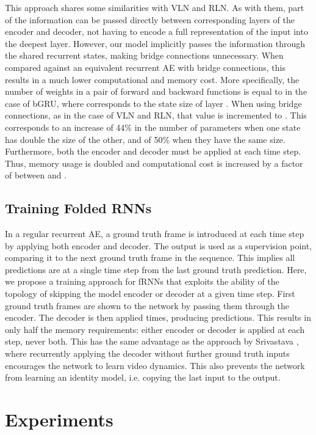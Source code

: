 \documentclass[runningheads]{llncs}
\begin{document}
This approach shares some similarities with VLN and RLN. As with them, part of the information can be passed directly between corresponding layers of the encoder and decoder, not having to encode a full representation of the input into the deepest layer. However, our model implicitly passes the information through the shared recurrent states, making bridge connections unnecessary. When compared against an equivalent recurrent AE with bridge connections, this results in a much lower computational and memory cost. More specifically, the number of weights in a pair of forward and backward functions is equal to  in the case of bGRU, where  corresponds to the state size of layer . When using bridge connections, as in the case of VLN and RLN, that value is incremented to . This corresponds to an increase of 44\% in the number of parameters when one state has double the size of the other, and of 50\% when they have the same size. Furthermore, both the encoder and decoder must be applied at each time step. Thus, memory usage is doubled and computational cost is increased by a factor of between  and .

\subsection{Training Folded RNNs}
\label{sec:method:training}

In a regular recurrent AE, a ground truth frame is introduced at each time step by applying both encoder and decoder. The output is used as a supervision point, comparing it to the next ground truth frame in the sequence. This implies all predictions are at a single time step from the last ground truth prediction. Here, we propose a training approach for fRNNs that exploits the ability of the topology of skipping the model encoder or decoder at a given time step. First  ground truth frames are shown to the network by passing them through the encoder. The decoder is then applied  times, producing  predictions. This results in only half the memory requirements: either encoder or decoder is applied at each step, never both. This has the same advantage as the approach by Srivastava \cite{srivastava2015unsupervised}, where recurrently applying the decoder without further ground truth inputs encourages the network to learn video dynamics. This also prevents the network from learning an identity model, i.e. copying the last input to the output.

\section{Experiments}
\label{sec:experiments}
\end{document}
